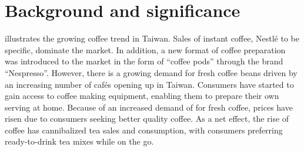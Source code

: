 \section{Background and significance}

\autocite{euromonitor_international_coffee_2015} illustrates the growing coffee
trend in Taiwan. Sales of instant coffee, Nestlé to be specific, dominate the
market. In addition, a new format of coffee preparation was introduced to the
market in the form of ``coffee pods'' through the brand ``Nespresso''. However,
there is a growing demand for fresh coffee beans driven by an increasing number
of cafés opening up in Taiwan. Consumers have started to gain access to coffee
making equipment, enabling them to prepare their own serving at home. Because of
an increased demand of for fresh coffee, prices have risen due to consumers
seeking better quality coffee. As a net effect, the rise of coffee has
cannibalized tea sales and consumption, with consumers preferring ready-to-drink
tea mixes while on the go.
